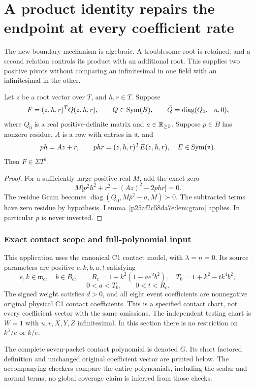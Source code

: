 \section{\texorpdfstring{A product identity repairs the endpoint at every coefficient rate}{A product identity repairs the endpoint at every coefficient rate}}
\label{component:p05180564ed05}
\label{p05180564ed05:sec:productrepair}
The new boundary mechanism is algebraic. A troublesome root is retained, and a second relation controls its product with an additional root. This supplies two positive pivots without comparing an infinitesimal in one field with an infinitesimal in the other.

\begin{lemma}\label{p05180564ed05:lem:productrepair}
Let $z$ be a root vector over $T$, and $h,r\in T$. Suppose
\[
F=(z,h,r)^TQ(z,h,r),\qquad Q\in\operatorname{Sym}(B),\qquad
\bar Q=\operatorname{diag}(Q_0,-a,0),
\]
where $Q_0$ is a real positive-definite matrix and $a\in\mathbb R_{\ge0}$. Suppose $p\in B$ has nonzero residue, $A$ is a row with entries in $\mathfrak n$, and
\[
ph=Az+r,\qquad phr=(z,h,r)^TE(z,h,r),\quad E\in\operatorname{Sym}(\mathfrak n).
\]
Then $F\in\Sigma T^2$.
\end{lemma}
\begin{proof}
For a sufficiently large positive real $M$, add the exact zero
\[
M\big[p^2h^2+r^2-(Az)^2-2phr\big]=0.
\]
The residue Gram becomes $\operatorname{diag}(Q_0,M\bar p^2-a,M)\succ0$. The subtracted terms have zero residue by hypothesis. Lemma~\ref{p25af2c58da7e:lem:gram} applies. In particular $p$ is never inverted.
\end{proof}

\subsubsection*{Exact contact scope and full-polynomial input}
This application uses the canonical C1 contact model, with $\lambda=n=0$. Its source parameters are positive $e,k,b,a,t$ satisfying
\[
e,k\in\mathfrak m_c,\quad b\in B_c,\qquad
R_c=1+k^2(1-ae^2b^2),\quad T_0=1+k^2-tk^4b^2,
\]
\[
0<a<T_0,\qquad0<t<R_c.
\]
The signed weight satisfies $d>0$, and all eight event coefficients are nonnegative original physical C1 contact coefficients. This is a specified contact chart, not every coefficient vector with the same omissions. The independent testing chart is $W=1$ with $u,v,X,Y,Z$ infinitesimal. In this section there is no restriction on $k^3/e$ or $k/e$.

The complete seven-packet contact polynomial is denoted $G$. Its short factored definition and unchanged original coefficient vector are printed below. The accompanying checkers compare the entire polynomials, including the scalar and normal terms; no global coverage claim is inferred from those checks.

